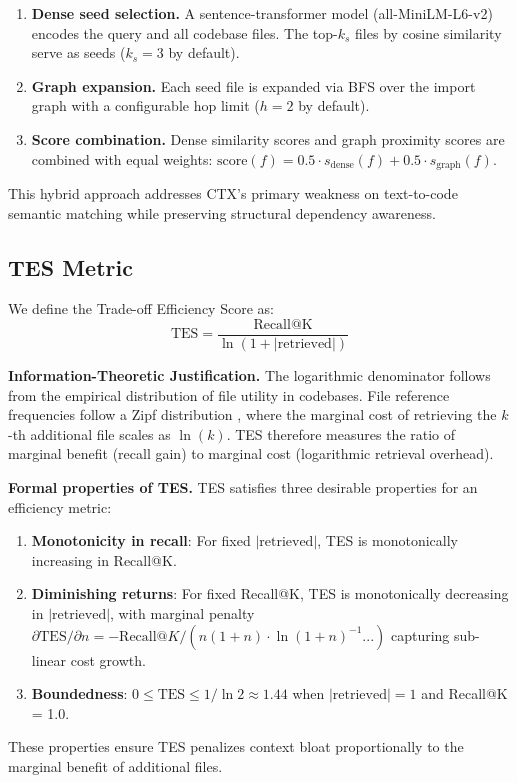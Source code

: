 \documentclass[11pt]{article}
\begin{document}
\begin{enumerate}
\item \textbf{Dense seed selection.} A sentence-transformer model (all-MiniLM-L6-v2) encodes the query and all codebase files. The top-$k_s$ files by cosine similarity serve as seeds ($k_s = 3$ by default).

\item \textbf{Graph expansion.} Each seed file is expanded via BFS over the import graph with a configurable hop limit ($h = 2$ by default).

\item \textbf{Score combination.} Dense similarity scores and graph proximity scores are combined with equal weights: $\text{score}(f) = 0.5 \cdot s_{\text{dense}}(f) + 0.5 \cdot s_{\text{graph}}(f)$.
\end{enumerate}

This hybrid approach addresses CTX's primary weakness on text-to-code semantic matching while preserving structural dependency awareness.

\subsection{TES Metric}

We define the Trade-off Efficiency Score as:
\begin{equation}
\text{TES} = \frac{\text{Recall@K}}{\ln(1 + |\text{retrieved}|)}
\end{equation}

\textbf{Information-Theoretic Justification.} The logarithmic denominator follows from the empirical distribution of file utility in codebases. File reference frequencies follow a Zipf distribution \citep{baxter2006java}, where the marginal cost of retrieving the $k$-th additional file scales as $\ln(k)$. TES therefore measures the ratio of marginal benefit (recall gain) to marginal cost (logarithmic retrieval overhead).

\textbf{Formal properties of TES.}
TES satisfies three desirable properties for an efficiency metric:
\begin{enumerate}
\item \textbf{Monotonicity in recall}: For fixed $|\text{retrieved}|$, TES is monotonically increasing in Recall@K.
\item \textbf{Diminishing returns}: For fixed Recall@K, TES is monotonically decreasing in $|\text{retrieved}|$, with marginal penalty $\partial \text{TES}/\partial n = -\text{Recall}@K / (n(1+n) \cdot \ln(1+n)^{-1}...)$ capturing sub-linear cost growth.
\item \textbf{Boundedness}: $0 \leq \text{TES} \leq 1/\ln 2 \approx 1.44$ when $|\text{retrieved}| = 1$ and Recall@K = 1.0.
\end{enumerate}
These properties ensure TES penalizes context bloat proportionally to the marginal benefit of additional files.
\end{document}
